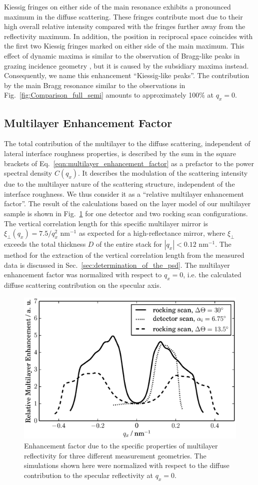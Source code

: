 \documentclass[twocolumn,osajnl,showpacs,superscriptaddress,11pt]{revtex4-1}
\begin{document}
Kiessig fringes on either side of the main resonance exhibits a pronounced maximum in the diffuse scattering. These fringes contribute most due to their high overall relative 
intensity compared with the fringes further away from the reflectivity maximum. In addition, the position in reciprocal space coincides with the first two Kiessig fringes marked on either side of the main maximum. This effect of dynamic maxima is similar to the observation of Bragg-like peaks in grazing incidence geometry \cite{PhysRevB.52.16369}, but it is caused by the subsidiary maxima instead. Consequently, we name this enhancement ``Kiessig-like peaks''. The contribution by the main Bragg resonance similar to the observations in Fig.~\ref{fig:Comparison_full_semi} amounts to approximately 100\% at $q_x=0$.

\subsection{Multilayer Enhancement Factor} \label{sec:multilayer_contribution}
The total contribution of the multilayer to the diffuse scattering, independent of lateral interface roughness properties, is described by the sum in the square brackets of Eq.~\eqref{eqn:multilayer_enhancement_factor} as a prefactor to the power spectral density $C(q_x)$. It describes the modulation of the scattering intensity due to the multilayer nature of the scattering structure, independent of the interface roughness. We thus consider it as a ``relative multilayer enhancement factor''. The result of the calculations based on the layer model of our multilayer sample is shown in Fig.~\ref{fig:MultilayerInfluence} for one detector and two rocking scan configurations. The vertical correlation length for this specific multilayer mirror is $\xi_\perp(q_x)=7.5/q_x^2$ nm$^{-1}$ as expected for a high-reflectance mirror, where $\xi_\perp$ 
exceeds the total thickness $D$ of the entire stack for $|q_x| < 0.12$ nm$^{-1}$. The method for the extraction of the vertical correlation length from the measured data is discussed in Sec.~\ref{sec:determination_of_the_psd}. The multilayer enhancement factor was normalized with respect to $q_x=0$, i.e. the calculated diffuse scattering contribution on the specular axis. 
\begin{figure}
	\includegraphics[width=0.5
	\textwidth]{MEF} \caption{Enhancement factor due to the specific properties of multilayer reflectivity for three different measurement geometries. The simulations shown here were normalized with respect to the diffuse contribution to the specular reflectivity at $q_x=0$.} \label{fig:MultilayerInfluence} 
\end{figure}
\end{document}
